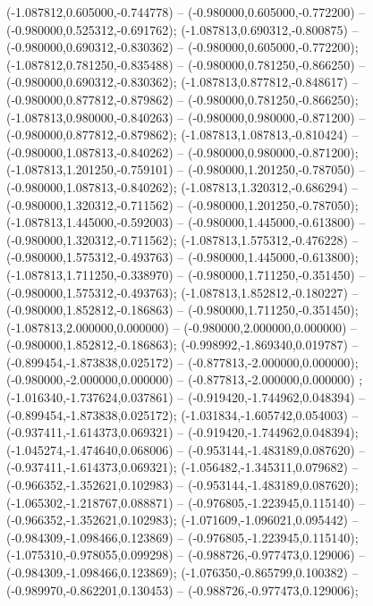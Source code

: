  (-1.087812,0.605000,-0.744778) -- (-0.980000,0.605000,-0.772200) -- (-0.980000,0.525312,-0.691762);
 (-1.087813,0.690312,-0.800875) -- (-0.980000,0.690312,-0.830362) -- (-0.980000,0.605000,-0.772200);
 (-1.087812,0.781250,-0.835488) -- (-0.980000,0.781250,-0.866250) -- (-0.980000,0.690312,-0.830362);
 (-1.087813,0.877812,-0.848617) -- (-0.980000,0.877812,-0.879862) -- (-0.980000,0.781250,-0.866250);
 (-1.087813,0.980000,-0.840263) -- (-0.980000,0.980000,-0.871200) -- (-0.980000,0.877812,-0.879862);
 (-1.087813,1.087813,-0.810424) -- (-0.980000,1.087813,-0.840262) -- (-0.980000,0.980000,-0.871200);
 (-1.087813,1.201250,-0.759101) -- (-0.980000,1.201250,-0.787050) -- (-0.980000,1.087813,-0.840262);
 (-1.087813,1.320312,-0.686294) -- (-0.980000,1.320312,-0.711562) -- (-0.980000,1.201250,-0.787050);
 (-1.087813,1.445000,-0.592003) -- (-0.980000,1.445000,-0.613800) -- (-0.980000,1.320312,-0.711562);
 (-1.087813,1.575312,-0.476228) -- (-0.980000,1.575312,-0.493763) -- (-0.980000,1.445000,-0.613800);
 (-1.087813,1.711250,-0.338970) -- (-0.980000,1.711250,-0.351450) -- (-0.980000,1.575312,-0.493763);
 (-1.087813,1.852812,-0.180227) -- (-0.980000,1.852812,-0.186863) -- (-0.980000,1.711250,-0.351450);
 (-1.087813,2.000000,0.000000) -- (-0.980000,2.000000,0.000000) -- (-0.980000,1.852812,-0.186863);
 (-0.998992,-1.869340,0.019787) -- (-0.899454,-1.873838,0.025172) -- (-0.877813,-2.000000,0.000000);
 (-0.980000,-2.000000,0.000000) -- (-0.877813,-2.000000,0.000000) ;
 (-1.016340,-1.737624,0.037861) -- (-0.919420,-1.744962,0.048394) -- (-0.899454,-1.873838,0.025172);
 (-1.031834,-1.605742,0.054003) -- (-0.937411,-1.614373,0.069321) -- (-0.919420,-1.744962,0.048394);
 (-1.045274,-1.474640,0.068006) -- (-0.953144,-1.483189,0.087620) -- (-0.937411,-1.614373,0.069321);
 (-1.056482,-1.345311,0.079682) -- (-0.966352,-1.352621,0.102983) -- (-0.953144,-1.483189,0.087620);
 (-1.065302,-1.218767,0.088871) -- (-0.976805,-1.223945,0.115140) -- (-0.966352,-1.352621,0.102983);
 (-1.071609,-1.096021,0.095442) -- (-0.984309,-1.098466,0.123869) -- (-0.976805,-1.223945,0.115140);
 (-1.075310,-0.978055,0.099298) -- (-0.988726,-0.977473,0.129006) -- (-0.984309,-1.098466,0.123869);
 (-1.076350,-0.865799,0.100382) -- (-0.989970,-0.862201,0.130453) -- (-0.988726,-0.977473,0.129006);
